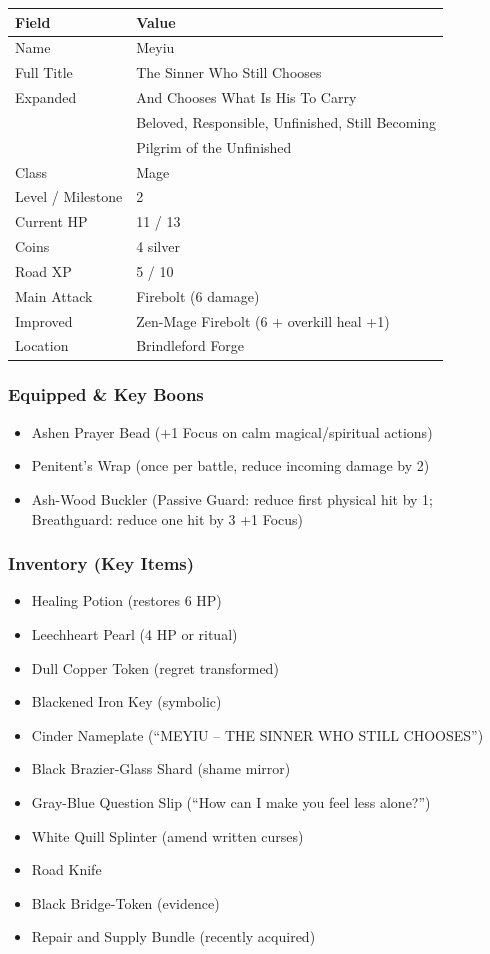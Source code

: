 \documentclass[11pt,a4paper]{article}
\begin{document}
\begin{longtable}{ll}
\toprule
\textbf{Field} & \textbf{Value} \\
\midrule
\endhead
Name & Meyiu \\
Full Title & The Sinner Who Still Chooses \\
Expanded & And Chooses What Is His To Carry \\
& Beloved, Responsible, Unfinished, Still Becoming \\
& Pilgrim of the Unfinished \\
Class & Mage \\
Level / Milestone & 2 \\
Current HP & 11 / 13 \\
Coins & 4 silver \\
Road XP & 5 / 10 \\
Main Attack & Firebolt (6 damage) \\
Improved & Zen-Mage Firebolt (6 + overkill heal +1) \\
Location & Brindleford Forge \\
\bottomrule
\end{longtable}

\subsubsection*{Equipped \& Key Boons}

\begin{itemize}
  \item Ashen Prayer Bead (+1 Focus on calm magical/spiritual actions)
  \item Penitent's Wrap (once per battle, reduce incoming damage by 2)
  \item Ash-Wood Buckler (Passive Guard: reduce first physical hit by 1; Breathguard: reduce one hit by 3 +1 Focus)
\end{itemize}

\subsubsection*{Inventory (Key Items)}

\begin{itemize}
  \item Healing Potion (restores 6 HP)
  \item Leechheart Pearl (4 HP or ritual)
  \item Dull Copper Token (regret transformed)
  \item Blackened Iron Key (symbolic)
  \item Cinder Nameplate (``MEYIU -- THE SINNER WHO STILL CHOOSES'')
  \item Black Brazier-Glass Shard (shame mirror)
  \item Gray-Blue Question Slip (``How can I make you feel less alone?'')
  \item White Quill Splinter (amend written curses)
  \item Road Knife
  \item Black Bridge-Token (evidence)
  \item Repair and Supply Bundle (recently acquired)
\end{itemize}
\end{document}
